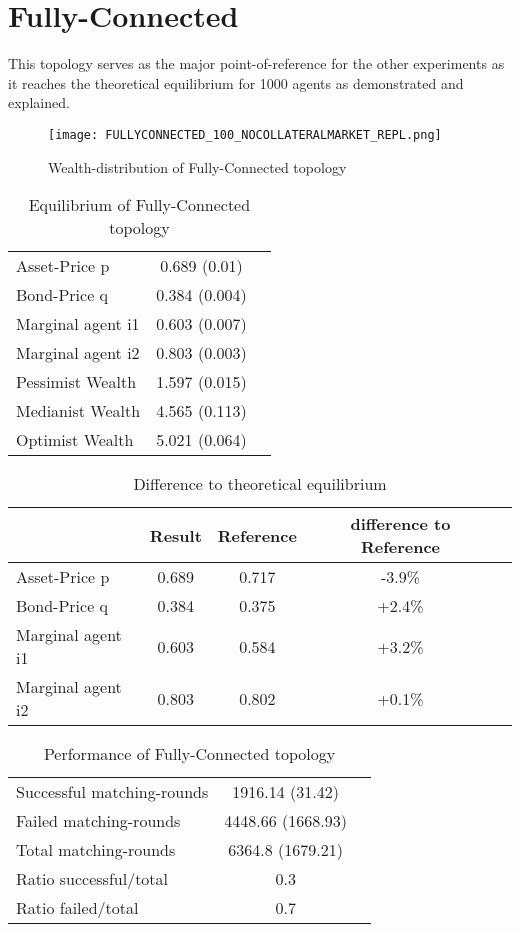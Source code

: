 \documentclass[Bachelorarbeit.tex]{subfiles}
\begin{document}
\section{Fully-Connected}
This topology serves as the major point-of-reference for the other experiments as it reaches the theoretical equilibrium for 1000 agents as demonstrated and explained.

\begin{figure}[H]
	\centering
  \texttt{[image: FULLYCONNECTED\_100\_NOCOLLATERALMARKET\_REPL.png]}
	\caption{Wealth-distribution of Fully-Connected topology}
	\label{fig:wealth_FULLYCONNECTED_100_NOCOLLATERALMARKET_REPL}
\end{figure}

\begin{table}[H]
	\caption{Equilibrium of Fully-Connected topology}
	\centering
	\begin{tabular} { l c r }
		\hline
		Asset-Price p & 0.689 (0.01) \\
		Bond-Price q & 0.384 (0.004) \\
		Marginal agent i1 & 0.603 (0.007) \\
		Marginal agent i2 & 0.803 (0.003) \\
		\hline
		Pessimist Wealth & 1.597 (0.015) \\
		Medianist Wealth & 4.565 (0.113) \\
		Optimist Wealth & 5.021 (0.064) \\
		\hline
	\end{tabular}
	\label{tab:fullyconnected_equilibrium_100Agents_05Bond}
\end{table} 

\begin{table}[H]
	\caption{Difference to theoretical equilibrium}
	\centering
	\begin{tabular} { l c c c r }
		& Result & Reference & difference to Reference \\
		\hline
		Asset-Price p & 0.689 & 0.717 & -3.9\% \\
		Bond-Price q & 0.384 & 0.375 & +2.4\% \\
		Marginal agent i1 & 0.603  & 0.584 & +3.2\% \\
		Marginal agent i2 & 0.803 & 0.802 & +0.1\% \\
		\hline
	\end{tabular}
\end{table}

\begin{table}[H]
	\caption{Performance of Fully-Connected topology}
	\centering
	\begin{tabular} { l c r }
		\hline
		Successful matching-rounds & 1916.14 (31.42) \\
		Failed matching-rounds & 4448.66 (1668.93) \\
		Total matching-rounds & 6364.8 (1679.21) \\
		\hline
		Ratio successful/total & 0.3 \\
		Ratio failed/total & 0.7 \\
		\hline
	\end{tabular}
\end{table}
\end{document}
